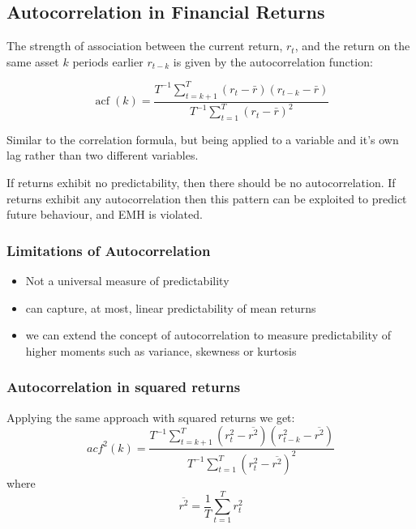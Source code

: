 \documentclass[11pt]{article}
\begin{document}
\subsection{Autocorrelation in Financial Returns}

The strength of association between the current return, $r_t$, and the return on the same asset $k$ periods earlier $r_{t-k}$ is given by the autocorrelation function:

\begin{equation*}
\operatorname{acf}(k)=\frac{T^{-1} \sum_{t=k+1}^T\left(r_t-\bar{r}\right)\left(r_{t-k}-\bar{r}\right)}{T^{-1} \sum_{t=1}^T\left(r_t-\bar{r}\right)^2}
\end{equation*}

Similar to the correlation formula, but being applied to a variable and it's own lag rather than two different variables.

If returns exhibit no predictability, then there should be no autocorrelation. If returns exhibit any autocorrelation then this pattern can be exploited to predict future behaviour, and EMH is violated.


\subsubsection*{Limitations of Autocorrelation}

\begin{itemize}
    \item Not a universal measure of predictability
    \item can capture, at most, linear predictability of mean returns
    \item we can extend the concept of autocorrelation to measure predictability of higher moments such as variance, skewness or kurtosis
\end{itemize}

\subsubsection*{Autocorrelation in squared returns}

Applying the same approach with squared returns we get:
\begin{equation}
a c f^2(k)=\frac{T^{-1} \sum_{t=k+1}^T\left(r_t^2-\overline{r^2}\right)\left(r_{t-k}^2-\overline{r^2}\right)}{T^{-1} \sum_{t=1}^T\left(r_t^2-\overline{r^2}\right)^2} 
\end{equation}
where
\begin{equation*}
    \overline{r^2}=\frac{1}{T} \sum_{t=1}^T r_t^2
\end{equation*}
\end{document}
